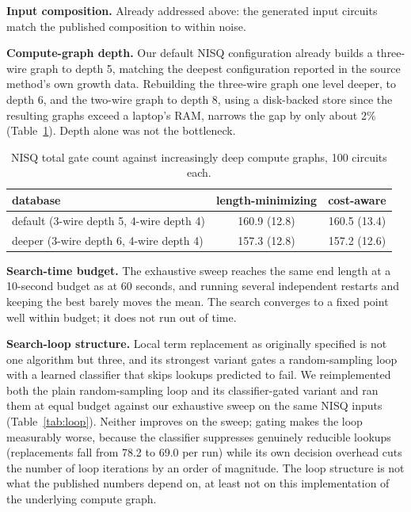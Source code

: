 \documentclass[11pt]{article}
\begin{document}
\textbf{Input composition.} Already addressed above: the generated input
circuits match the published composition to within noise.

\textbf{Compute-graph depth.} Our default NISQ configuration already
builds a three-wire graph to depth 5, matching the deepest configuration
reported in the source method's own growth data. Rebuilding the
three-wire graph one level deeper, to depth 6, and the two-wire graph to
depth 8, using a disk-backed store since the resulting graphs exceed a
laptop's RAM, narrows the gap by only about 2\% (Table~\ref{tab:deep}).
Depth alone was not the bottleneck.

\begin{table}[H]
\centering
\caption{NISQ total gate count against increasingly deep compute graphs,
100 circuits each.}
\label{tab:deep}
\begin{tabular}{lcc}
\toprule
database & length-minimizing & cost-aware \\
\midrule
default (3-wire depth 5, 4-wire depth 4) & 160.9 (12.8) & 160.5 (13.4) \\
deeper (3-wire depth 6, 4-wire depth 4)  & 157.3 (12.8) & 157.2 (12.6) \\
\bottomrule
\end{tabular}
\end{table}

\textbf{Search-time budget.} The exhaustive sweep reaches the same end
length at a 10-second budget as at 60 seconds, and running several
independent restarts and keeping the best barely moves the mean. The
search converges to a fixed point well within budget; it does not run out
of time.

\textbf{Search-loop structure.} \label{sec:sampling}
Local term replacement as originally specified is not one algorithm but
three, and its strongest variant gates a random-sampling loop with a
learned classifier that skips lookups predicted to fail. We reimplemented
both the plain random-sampling loop and its classifier-gated variant and
ran them at equal budget against our exhaustive sweep on the same NISQ
inputs (Table~\ref{tab:loop}). Neither improves on the sweep; gating makes
the loop measurably worse, because the classifier suppresses genuinely
reducible lookups (replacements fall from 78.2 to 69.0 per run) while its
own decision overhead cuts the number of loop iterations by an order of
magnitude. The loop structure is not what the published numbers depend
on, at least not on this implementation of the underlying compute graph.
\end{document}
